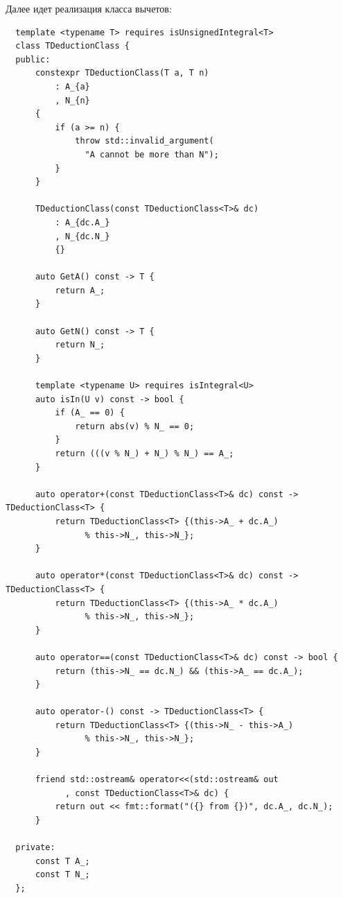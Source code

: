 \documentclass[a4paper]{article}
\newenvironment{code}{\captionsetup{type=listing}}{}
\begin{document}
Далее идет реализация класса вычетов:
\begin{code}
\begin{verbatim}
  template <typename T> requires isUnsignedIntegral<T>
  class TDeductionClass {
  public:
      constexpr TDeductionClass(T a, T n)
          : A_{a}
          , N_{n}
      {
          if (a >= n) {
              throw std::invalid_argument(
                "A cannot be more than N");
          }
      }
  
      TDeductionClass(const TDeductionClass<T>& dc)
          : A_{dc.A_}
          , N_{dc.N_}
          {}
  
      auto GetA() const -> T {
          return A_;
      }
  
      auto GetN() const -> T {
          return N_;
      }
  
      template <typename U> requires isIntegral<U>
      auto isIn(U v) const -> bool {
          if (A_ == 0) {
              return abs(v) % N_ == 0;
          }
          return (((v % N_) + N_) % N_) == A_;
      }
  
      auto operator+(const TDeductionClass<T>& dc) const -> TDeductionClass<T> {
          return TDeductionClass<T> {(this->A_ + dc.A_)
                % this->N_, this->N_};
      }
  
      auto operator*(const TDeductionClass<T>& dc) const -> TDeductionClass<T> {
          return TDeductionClass<T> {(this->A_ * dc.A_)
                % this->N_, this->N_};
      }
  
      auto operator==(const TDeductionClass<T>& dc) const -> bool {
          return (this->N_ == dc.N_) && (this->A_ == dc.A_);
      }
  
      auto operator-() const -> TDeductionClass<T> {
          return TDeductionClass<T> {(this->N_ - this->A_)
                % this->N_, this->N_};
      }
  
      friend std::ostream& operator<<(std::ostream& out
            , const TDeductionClass<T>& dc) {
          return out << fmt::format("({} from {})", dc.A_, dc.N_);
      }
  
  private:
      const T A_;
      const T N_;
  };
\end{verbatim}
\end{code}
\end{document}
